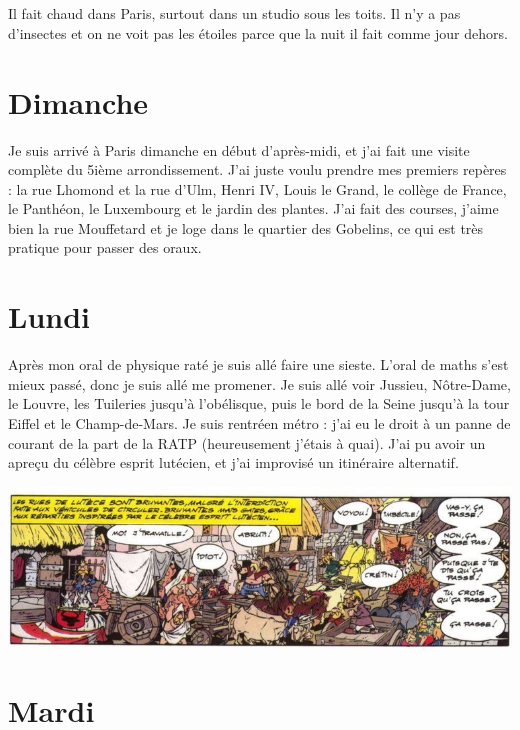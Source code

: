 \documentclass[french,a4paper, 12pt]{article}
\begin{document}
\section*{}

Il fait chaud dans Paris, surtout dans un studio sous les toits. Il n'y a pas d'insectes et on ne voit pas les étoiles parce que la nuit il fait comme jour dehors.

\section*{Dimanche}

Je suis arrivé à Paris dimanche en début d'après-midi, et j'ai fait une visite complète du 5ième arrondissement. J'ai juste voulu prendre mes premiers repères : la rue Lhomond et la rue d'Ulm, Henri IV, Louis le Grand, le collège de France, le Panthéon, le Luxembourg et le jardin des plantes. J'ai fait des courses, j'aime bien la rue Mouffetard et je loge dans le quartier des Gobelins, ce qui est très pratique pour passer des oraux.

\section*{Lundi}

Après mon oral de physique raté je suis allé faire une sieste. L'oral de maths s'est mieux passé, donc je suis allé me promener. Je suis allé voir Jussieu, Nôtre-Dame, le Louvre, les Tuileries jusqu'à l'obélisque, puis le bord de la Seine jusqu'à la tour Eiffel et le Champ-de-Mars. Je suis rentréen métro : j'ai eu le droit à un panne de courant de la part de la RATP (heureusement j'étais à quai). J'ai pu avoir un apreçu du célèbre esprit lutécien, et j'ai improvisé un itinéraire alternatif.

\includegraphics[scale=0.65]{asterix.jpg}

\section*{Mardi}
\end{document}
